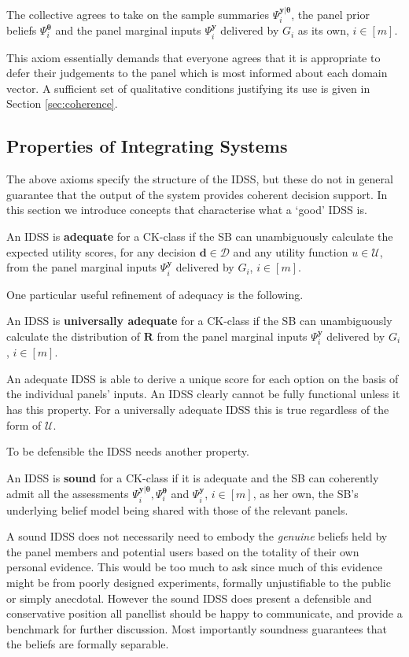\begin{axiom}
\label{axiom:quantitative}
The collective agrees to take on the sample summaries $\Psi _{i}^{\bm{y}|\bm{\theta} }$, the panel prior beliefs $\Psi _{i}^{\bm{\theta} }$ and the panel marginal inputs $\Psi _{i}^{\bm{y}}$ delivered by $G_{i}$ as its own, $i\in[m]$.
\end{axiom}
This axiom essentially demands that everyone agrees that it is appropriate to defer their judgements to the panel which is most informed about each domain vector. A sufficient set of qualitative conditions justifying its use is given in Section \ref{sec:coherence}.
\subsection{Properties of Integrating Systems}
The above axioms specify the structure of the IDSS, but these do not in general guarantee that the output of the system provides coherent decision support. In this section we introduce concepts that characterise what a \lq{good}' IDSS is.
\begin{definition}
\label{def:adequacy}
An IDSS is \textbf{adequate} for a CK-class if the SB can unambiguously calculate the expected utility scores, for any decision $\bm{d}\in \bm{\mathcal{D}}$ and any utility function $u\in \mathcal{U}$, from the panel marginal inputs $\Psi _{i}^{\bm{y}}$ delivered by $G_{i}$, $i\in[m]$.
\end{definition}
One particular useful refinement of adequacy is the following.
\begin{definition}
An IDSS is \textbf{universally adequate} for a CK-class if the SB can unambiguously calculate the distribution of $\bm{R}$ from the panel marginal inputs $\Psi _{i}^{\bm{y}}$ delivered by $G_{i}$, $i\in[m]$.
\end{definition}
An adequate IDSS is able to derive a unique score for each option on the basis of the individual panels' inputs. An IDSS clearly cannot be fully functional unless it has this property. For a universally adequate IDSS this is true regardless of the form of $\mathcal{U}$.

To be defensible the IDSS needs another property.
\begin{definition}
An IDSS is \textbf{sound} for a CK-class if it is adequate and the SB can coherently admit all the assessments $\Psi_{i}^{\bm{y}|\bm{\theta} },\Psi _{i}^{\bm{\theta }}$ and $\Psi _{i}^{\bm{y}}$, $i\in[m]$, as her own, the SB's underlying belief model being shared with those of the relevant panels.
\end{definition}
A sound IDSS does not necessarily need to embody the \emph{genuine} beliefs held by the panel members and potential users based on the totality of their own personal evidence. This would be too much to ask since much of this evidence might be from poorly designed experiments, formally unjustifiable to the public or simply anecdotal. However the sound IDSS does present a defensible and conservative position all panellist should be happy to communicate, and provide a benchmark for further discussion. Most importantly soundness guarantees that the beliefs are formally separable.

